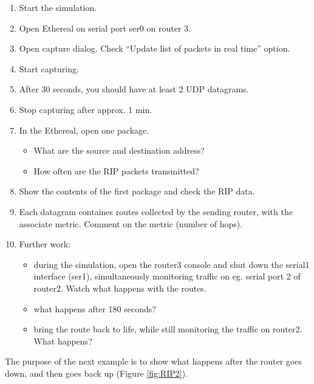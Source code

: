 \begin{enumerate}
 \item	Start the simulation.
 \item	Open Ethereal on serial port ser0 on router 3.
 \item	Open capture dialog. Check ``Update list of packets in real time''
option.
 \item	Start capturing.
 \item	After 30 seconds, you should have at least 2 UDP datagrams.
 \item	Stop capturing after approx. 1 min.
 \item	In the Ethereal, open one package. 
  \begin{itemize}
   \item	What are the source and destination address?
   \item	How often are the RIP packets transmitted?
  \end{itemize}
 \item	Show the contents of the first package and check the RIP data.
 \item	Each datagram containes routes collected by the sending router, with
the associate metric. Comment on the metric (number of hops).
 \item	Further work:
   \begin{itemize}
    \item	during the simulation, open the router3 console and shut down
the serial1 interface (ser1), simultaneously monitoring traffic on eg. serial
port 2 of router2. Watch what happens with the routes. 
    \item	what happens after 180 seconds?
    \item	bring the route back to life, while still monitoring the
traffic on router2. What happens?
   \end{itemize}
\end{enumerate}

The purpose of the next example is to show what happens after the router goes
down, and then goes back up (Figure \ref{fig:RIP2}).


